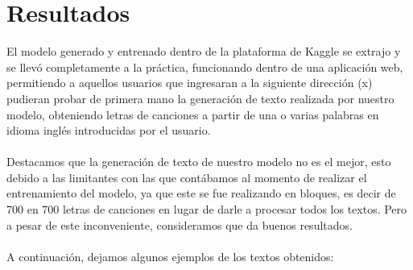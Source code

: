 \section{Resultados}
El modelo generado y entrenado dentro de la plataforma de Kaggle se extrajo y se llevó completamente a la práctica, funcionando dentro de una aplicación web, permitiendo a aquellos usuarios que ingresaran a la siguiente dirección (x) pudieran probar de primera mano la generación de texto realizada por nuestro modelo, obteniendo letras de canciones a partir de una o varias palabras en idioma inglés introducidas por el usuario.\\\\
Destacamos que la generación de texto de nuestro modelo no es el mejor, esto debido a las limitantes con las que contábamos al momento de realizar el entrenamiento del modelo, ya que este se fue realizando en bloques, es decir de 700 en 700 letras de canciones en lugar de darle a procesar todos los textos. Pero a pesar de este inconveniente, consideramos que da buenos resultados.\\\\
A continuación, dejamos algunos ejemplos de los textos obtenidos:
